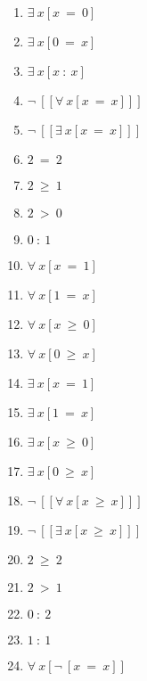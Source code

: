 \documentclass{article}
\begin{document}
\begin{enumerate}
\item $\exists \ x[x \ = \ 0]$

\item $\exists \ x[0 \ = \ x]$

\item $\exists \ x[x \ : \ x]$

\item $\neg \ [[\forall \ x[x \ = \ x]]]$

\item $\neg \ [[\exists \ x[x \ = \ x]]]$

\item $2 \ = \ 2$

\item $2 \ \ge \ 1$

\item $2 \ > \ 0$

\item $0 \ : \ 1$

\item $\forall \ x[x \ = \ 1]$

\item $\forall \ x[1 \ = \ x]$

\item $\forall \ x[x \ \ge \ 0]$

\item $\forall \ x[0 \ \ge \ x]$

\item $\exists \ x[x \ = \ 1]$

\item $\exists \ x[1 \ = \ x]$

\item $\exists \ x[x \ \ge \ 0]$

\item $\exists \ x[0 \ \ge \ x]$

\item $\neg \ [[\forall \ x[x \ \ge \ x]]]$

\item $\neg \ [[\exists \ x[x \ \ge \ x]]]$

\item $2 \ \ge \ 2$

\item $2 \ > \ 1$

\item $0 \ : \ 2$

\item $1 \ : \ 1$

\item $\forall \ x[\neg \ [x \ = \ x]]$


\end{enumerate}
\end{document}
